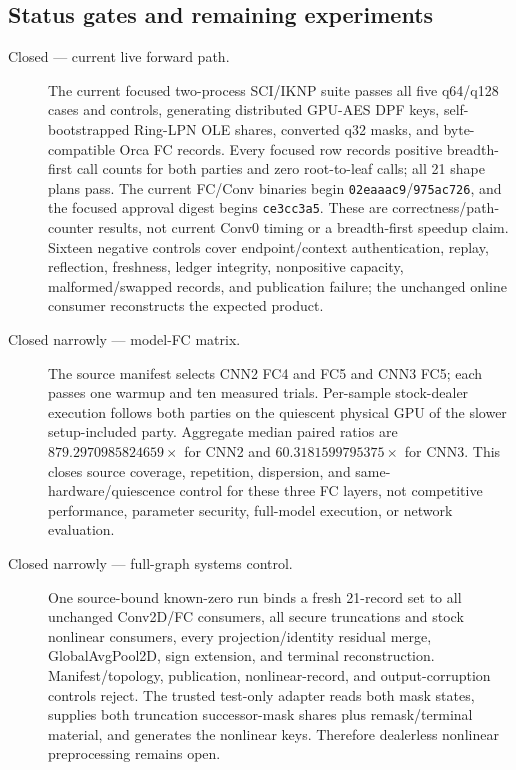 \documentclass[11pt]{article}
\begin{document}
\subsection{Status gates and remaining experiments}
\label{sec:milestones}

\begin{description}
\item[Closed --- current live forward path.] The current focused two-process
  SCI/IKNP suite passes all five q64/q128 cases and controls, generating
  distributed GPU-AES DPF keys, self-bootstrapped Ring-LPN OLE shares, converted
  q32 masks, and byte-compatible Orca FC records. Every focused row records
  positive breadth-first call counts for both parties and zero root-to-leaf
  calls; all 21 shape plans pass. The current FC/Conv binaries begin
  \texttt{02eaaac9}/\texttt{975ac726}, and the focused approval digest begins
  \texttt{ce3cc3a5}. These are correctness/path-counter results, not current
  Conv0 timing or a breadth-first speedup claim. Sixteen negative
  controls cover endpoint/context authentication, replay, reflection, freshness,
  ledger integrity, nonpositive capacity, malformed/swapped records, and
  publication failure; the unchanged online consumer reconstructs the expected
  product.
\item[Closed narrowly --- model-FC matrix.] The source manifest selects CNN2
  FC4 and FC5 and CNN3 FC5; each passes one warmup and ten measured trials.
  Per-sample stock-dealer execution follows both parties on the quiescent
  physical GPU of the slower setup-included party. Aggregate median paired
  ratios are $879.2970985824659\times$ for CNN2 and
  $60.3181599795375\times$ for CNN3. This closes source coverage, repetition,
  dispersion, and same-hardware/quiescence control for these three FC layers,
  not competitive performance, parameter security, full-model execution, or
  network evaluation.
\item[Closed narrowly --- full-graph systems control.] One source-bound
  known-zero run binds a fresh 21-record set to all unchanged Conv2D/FC
  consumers, all secure truncations and stock nonlinear consumers, every
  projection/identity residual merge, GlobalAvgPool2D, sign extension, and
  terminal reconstruction. Manifest/topology, publication, nonlinear-record,
  and output-corruption controls reject. The trusted test-only adapter reads
  both mask states, supplies both truncation successor-mask shares plus
  remask/terminal material, and generates the nonlinear keys. Therefore
  dealerless nonlinear preprocessing remains open.

\end{description}
\end{document}
